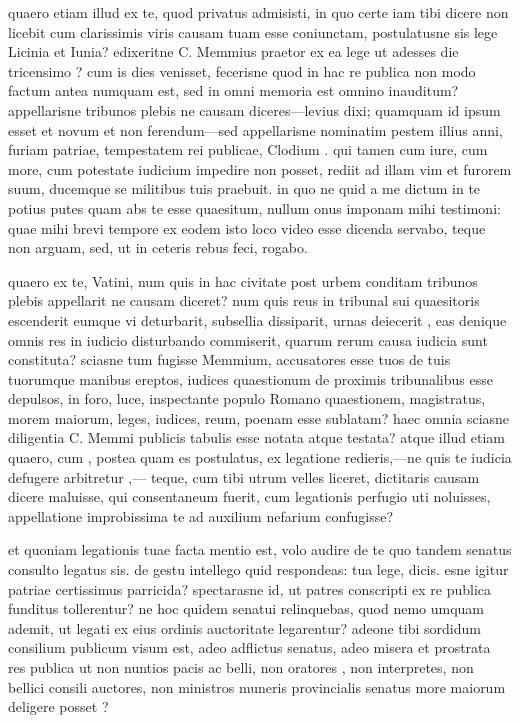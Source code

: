  quaero etiam illud ex te, quod privatus admisisti, in quo certe iam tibi dicere non licebit cum clarissimis viris causam tuam esse coniunctam, postulatusne sis lege Licinia et Iunia? edixeritne C. Memmius praetor ex ea lege ut adesses die tricensimo ? cum is dies venisset, fecerisne quod in hac re publica non modo factum antea numquam est, sed in omni memoria est omnino inauditum? appellarisne tribunos plebis ne causam diceres—levius dixi; quamquam id ipsum esset et novum et non ferendum—sed appellarisne nominatim pestem illius anni, furiam patriae, tempestatem rei publicae, Clodium . qui tamen cum iure, cum more, cum potestate iudicium impedire non posset, rediit ad illam vim et furorem suum, ducemque se militibus tuis praebuit. in quo ne quid a me dictum in te potius putes quam abs te esse quaesitum, nullum onus imponam mihi testimoni: quae mihi brevi tempore ex eodem isto loco video esse dicenda servabo, teque non arguam, sed, ut in ceteris rebus feci, rogabo.

 quaero ex te, Vatini, num quis in hac civitate post urbem conditam tribunos plebis appellarit ne causam diceret? num quis reus in tribunal sui quaesitoris escenderit eumque vi deturbarit, subsellia dissiparit, urnas deiecerit , eas denique omnis res in iudicio disturbando commiserit, quarum rerum causa iudicia sunt constituta? sciasne tum fugisse Memmium, accusatores esse tuos de tuis tuorumque manibus ereptos, iudices quaestionum de proximis tribunalibus esse depulsos, in foro, luce, inspectante populo Romano quaestionem, magistratus, morem maiorum, leges, iudices, reum, poenam esse sublatam? haec omnia sciasne diligentia C. Memmi publicis tabulis esse notata atque testata? atque illud etiam quaero, cum , postea quam es postulatus, ex legatione redieris,—ne quis te iudicia defugere arbitretur ,— teque, cum tibi utrum velles liceret, dictitaris causam dicere maluisse, qui consentaneum fuerit, cum legationis perfugio uti noluisses, appellatione improbissima te ad auxilium nefarium confugisse?

 et quoniam legationis tuae facta mentio est, volo audire de te quo tandem senatus consulto legatus sis. de gestu intellego quid respondeas: tua lege, dicis. esne igitur patriae certissimus parricida? spectarasne id, ut patres conscripti ex re publica funditus tollerentur? ne hoc quidem senatui relinquebas, quod nemo umquam ademit, ut legati ex eius ordinis auctoritate legarentur? adeone tibi sordidum consilium publicum visum est, adeo adflictus senatus, adeo misera et prostrata res publica ut non nuntios pacis ac belli, non oratores , non interpretes, non bellici consili auctores, non ministros muneris provincialis senatus more maiorum deligere posset ?

